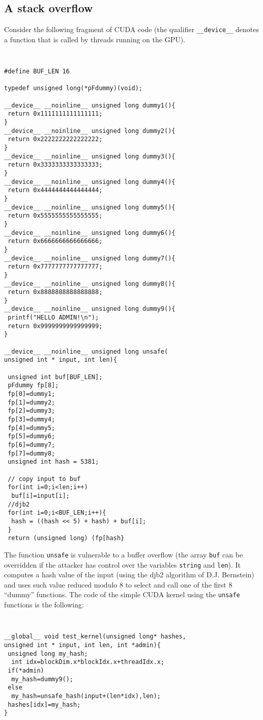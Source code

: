 \documentclass[11pt]{llncs}
\begin{document}
\subsection{A stack overflow}
\label{stack}
Consider the following fragment of CUDA code (the qualifier \texttt{\_\_device\_\_} denotes a function that is called by threads running on the GPU).
{\tt \small
\begin{verbatim}
#define BUF_LEN 16

typedef unsigned long(*pFdummy)(void);

__device__ __noinline__ unsigned long dummy1(){
 return 0x1111111111111111;
}
__device__ __noinline__ unsigned long dummy2(){
 return 0x2222222222222222;
}
__device__ __noinline__ unsigned long dummy3(){
 return 0x3333333333333333;
}
__device__ __noinline__ unsigned long dummy4(){
 return 0x4444444444444444;
}
__device__ __noinline__ unsigned long dummy5(){
 return 0x5555555555555555;
}
__device__ __noinline__ unsigned long dummy6(){
 return 0x6666666666666666;
}
__device__ __noinline__ unsigned long dummy7(){
 return 0x7777777777777777;
}
__device__ __noinline__ unsigned long dummy8(){
 return 0x8888888888888888;
}
__device__ __noinline__ unsigned long dummy9(){
 printf("HELLO ADMIN!\n");
 return 0x9999999999999999;
}

__device__ __noinline__ unsigned long unsafe(
unsigned int * input, int len){

 unsigned int buf[BUF_LEN];
 pFdummy fp[8];
 fp[0]=dummy1;
 fp[1]=dummy2;
 fp[2]=dummy3;
 fp[3]=dummy4;
 fp[4]=dummy5;
 fp[5]=dummy6;
 fp[6]=dummy7;
 fp[7]=dummy8;
 unsigned int hash = 5381;

 // copy input to buf
 for(int i=0;i<len;i++)
  buf[i]=input[i];
 //djb2
 for(int i=0;i<BUF_LEN;i++){
  hash = ((hash << 5) + hash) + buf[i];
 }
 return (unsigned long) (fp[hash}
\end{verbatim}
}
The function \texttt{unsafe} is vulnerable to a buffer overflow (the array \texttt{buf} can be overridden if the attacker has control over the variables \texttt{string} and \texttt{len}).
It computes a hash value of the input (using the djb2 algorithm of D.J. Bernstein) and uses such value reduced modulo 8 to select and call one of the first 8 ``dummy'' functions.
The code of the simple CUDA kernel using the \texttt{unsafe} functions is the following:
{\tt \small
\begin{verbatim}
__global__ void test_kernel(unsigned long* hashes,
unsigned int * input, int len, int *admin){
 unsigned long my_hash;
  int idx=blockDim.x*blockIdx.x+threadIdx.x;
 if(*admin)
  my_hash=dummy9();
 else
  my_hash=unsafe_hash(input+(len*idx),len);
 hashes[idx]=my_hash;
} 
\end{verbatim}
}
\end{document}
